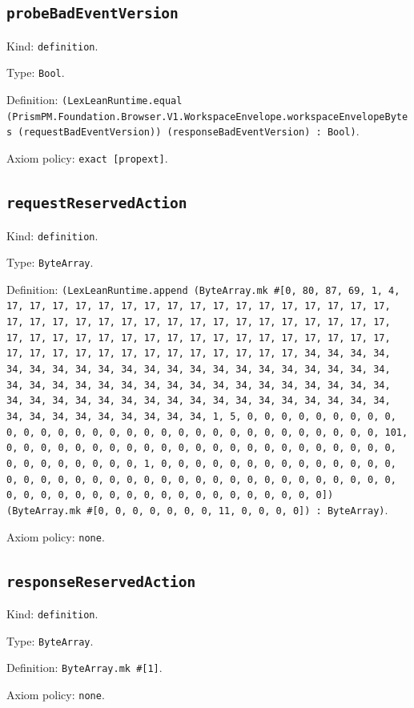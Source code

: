 \documentclass[11pt]{article}
\begin{document}
\subsection*{\texttt{probeBadEventVersion}}
\noindent Kind: \texttt{definition}.\par
\noindent Type: \texttt{Bool}.\par
\noindent Definition: \texttt{(LexLeanRuntime.equal (PrismPM.Foundation.Browser.V1.WorkspaceEnvelope.workspaceEnvelopeBytes (requestBadEventVersion)) (responseBadEventVersion) : Bool)}.\par
\noindent Axiom policy: \texttt{exact [propext]}.\par
\subsection*{\texttt{requestReservedAction}}
\noindent Kind: \texttt{definition}.\par
\noindent Type: \texttt{ByteArray}.\par
\noindent Definition: \texttt{(LexLeanRuntime.append (ByteArray.mk \#[0, 80, 87, 69, 1, 4, 17, 17, 17, 17, 17, 17, 17, 17, 17, 17, 17, 17, 17, 17, 17, 17, 17, 17, 17, 17, 17, 17, 17, 17, 17, 17, 17, 17, 17, 17, 17, 17, 17, 17, 17, 17, 17, 17, 17, 17, 17, 17, 17, 17, 17, 17, 17, 17, 17, 17, 17, 17, 17, 17, 17, 17, 17, 17, 17, 17, 17, 17, 17, 17, 34, 34, 34, 34, 34, 34, 34, 34, 34, 34, 34, 34, 34, 34, 34, 34, 34, 34, 34, 34, 34, 34, 34, 34, 34, 34, 34, 34, 34, 34, 34, 34, 34, 34, 34, 34, 34, 34, 34, 34, 34, 34, 34, 34, 34, 34, 34, 34, 34, 34, 34, 34, 34, 34, 34, 34, 34, 34, 34, 34, 34, 34, 34, 34, 1, 5, 0, 0, 0, 0, 0, 0, 0, 0, 0, 0, 0, 0, 0, 0, 0, 0, 0, 0, 0, 0, 0, 0, 0, 0, 0, 0, 0, 0, 0, 0, 0, 101, 0, 0, 0, 0, 0, 0, 0, 0, 0, 0, 0, 0, 0, 0, 0, 0, 0, 0, 0, 0, 0, 0, 0, 0, 0, 0, 0, 0, 0, 0, 0, 1, 0, 0, 0, 0, 0, 0, 0, 0, 0, 0, 0, 0, 0, 0, 0, 0, 0, 0, 0, 0, 0, 0, 0, 0, 0, 0, 0, 0, 0, 0, 0, 0, 0, 0, 0, 0, 0, 0, 0, 0, 0, 0, 0, 0, 0, 0, 0, 0, 0, 0, 0, 0, 0, 0, 0, 0]) (ByteArray.mk \#[0, 0, 0, 0, 0, 0, 0, 11, 0, 0, 0, 0]) : ByteArray)}.\par
\noindent Axiom policy: \texttt{none}.\par
\subsection*{\texttt{responseReservedAction}}
\noindent Kind: \texttt{definition}.\par
\noindent Type: \texttt{ByteArray}.\par
\noindent Definition: \texttt{ByteArray.mk \#[1]}.\par
\noindent Axiom policy: \texttt{none}.\par
\end{document}
